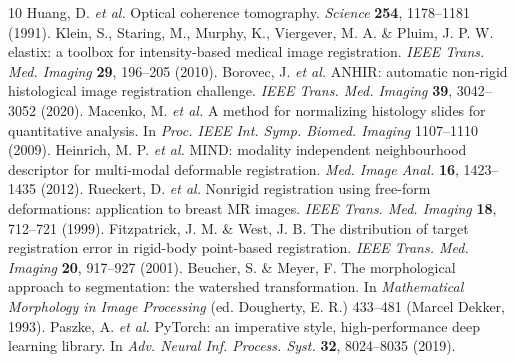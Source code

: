 \documentclass[9pt,twocolumn]{extarticle}
\begin{document}
\begingroup\footnotesize
\begin{thebibliography}{10}\setlength{\itemsep}{0pt}
 Huang, D. \emph{et al.} Optical coherence tomography. \emph{Science} \textbf{254}, 1178--1181 (1991).
 Klein, S., Staring, M., Murphy, K., Viergever, M. A. \& Pluim, J. P. W. elastix: a toolbox for intensity-based medical image registration. \emph{IEEE Trans. Med. Imaging} \textbf{29}, 196--205 (2010).
 Borovec, J. \emph{et al.} ANHIR: automatic non-rigid histological image registration challenge. \emph{IEEE Trans. Med. Imaging} \textbf{39}, 3042--3052 (2020).
 Macenko, M. \emph{et al.} A method for normalizing histology slides for quantitative analysis. In \emph{Proc. IEEE Int. Symp. Biomed. Imaging} 1107--1110 (2009).
 Heinrich, M. P. \emph{et al.} MIND: modality independent neighbourhood descriptor for multi-modal deformable registration. \emph{Med. Image Anal.} \textbf{16}, 1423--1435 (2012).
 Rueckert, D. \emph{et al.} Nonrigid registration using free-form deformations: application to breast MR images. \emph{IEEE Trans. Med. Imaging} \textbf{18}, 712--721 (1999).
 Fitzpatrick, J. M. \& West, J. B. The distribution of target registration error in rigid-body point-based registration. \emph{IEEE Trans. Med. Imaging} \textbf{20}, 917--927 (2001).
 Beucher, S. \& Meyer, F. The morphological approach to segmentation: the watershed transformation. In \emph{Mathematical Morphology in Image Processing} (ed. Dougherty, E. R.) 433--481 (Marcel Dekker, 1993).
 Paszke, A. \emph{et al.} PyTorch: an imperative style, high-performance deep learning library. In \emph{Adv. Neural Inf. Process. Syst.} \textbf{32}, 8024--8035 (2019).
\end{thebibliography}
\endgroup
\end{document}
